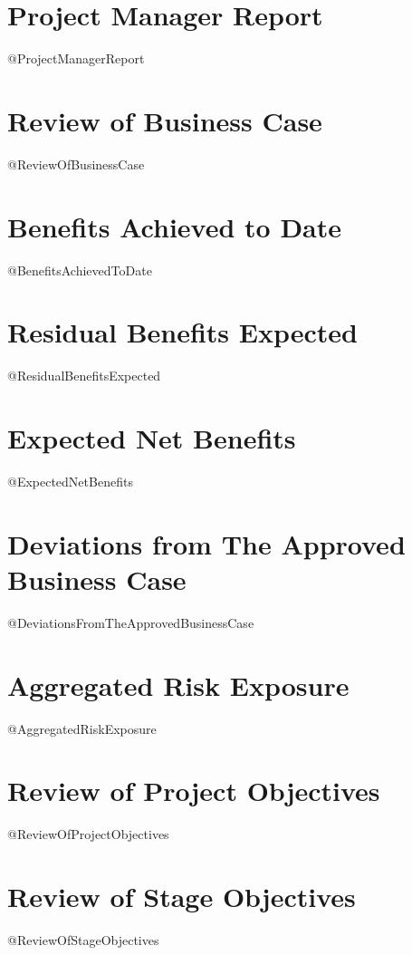 \documentclass{report}
\begin{document}
\date{\today}
\author{@Author}

\maketitle

\tableofcontents

\newpage


\section{Project Manager Report}
@ProjectManagerReport

\section{Review of Business Case}
@ReviewOfBusinessCase

\section{Benefits Achieved to Date}
@BenefitsAchievedToDate

\section{Residual Benefits Expected}
@ResidualBenefitsExpected

\section{Expected Net Benefits}
@ExpectedNetBenefits

\section{Deviations from The Approved Business Case}
@DeviationsFromTheApprovedBusinessCase

\section{Aggregated Risk Exposure}
@AggregatedRiskExposure

\section{Review of Project Objectives}
@ReviewOfProjectObjectives

\section{Review of Stage Objectives}
@ReviewOfStageObjectives
\end{document}
